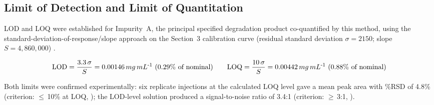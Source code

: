 \subsection{Limit of Detection and Limit of Quantitation}
LOD and LOQ were established for Impurity~A, the principal specified degradation product
co-quantified by this method, using the standard-deviation-of-response/slope approach on the
Section~3 calibration curve (residual standard deviation $\sigma = 2150$; slope
$S = 4{,}860{,}000$) \citep{ich2005q2}.

\[
\text{LOD} = \frac{3.3\,\sigma}{S} = 0.00146\,mg\,mL\textsuperscript{-1}\ (0.29\%\ \text{of nominal}) \qquad
\text{LOQ} = \frac{10\,\sigma}{S} = 0.00442\,mg\,mL\textsuperscript{-1}\ (0.88\%\ \text{of nominal})
\]

Both limits were confirmed experimentally: six replicate injections at the calculated LOQ level
gave a mean peak area with \%RSD of 4.8\% (criterion: $\leq$\,10\% at LOQ, \passbadge); the
LOD-level solution produced a signal-to-noise ratio of 3.4:1 (criterion: $\geq$\,3:1,
\passbadge).
